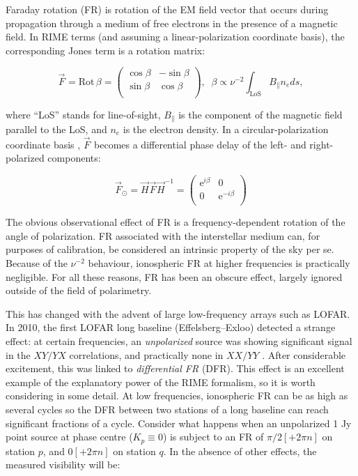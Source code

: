 \documentclass{aa}
\newcommand{\matrixtt}[4]{\left( \begin{array}{cc}#1&#2\\#3&#4\\\end{array} \right)}
\newcommand{\jones}[2]{\vec {#1}_{#2}}
\newcommand{\jonesinv}[2]{\vec {#1}^{-1}_{#2}}
\begin{document}
Faraday rotation (FR) is rotation of the EM field vector that occurs during propagation through a medium of free electrons in the presence of a magnetic field. In RIME terms (and assuming a linear-polarization coordinate basis), the corresponding Jones term is a rotation matrix:

\begin{equation}\label{eq:FR}
\jones{F}{} = \mathrm{Rot}\,\beta = \matrixtt{\cos\beta}{-\sin\beta}{\sin\beta}{\cos\beta}, \;\;
\beta \propto \nu^{-2} \int_\mathrm{LoS} B_{\parallel} n_e ds,
\end{equation}

where ``LoS'' stands for line-of-sight, $B_{\parallel}$ is the component of the magnetic field parallel to the LoS, and $n_e$ is the electron density. In a circular-polarization coordinate basis \citep[see Paper I,][Sect.~6.3]{RRIME1}, $\jones{F}{}$ becomes a differential phase delay of the left- and right-polarized components:

\[
\jones{F}{\odot} = \jones{H}{}\jones{F}{}\jonesinv{H}{} = \matrixtt{\mathrm{e}^{i\beta}}{0}{0}{\mathrm{e}^{-i\beta}}
\]

The obvious observational effect of FR is a frequency-dependent rotation of the angle of polarization. FR associated with the interstellar medium can, for purposes of calibration, be considered an intrinsic property of the sky per se. Because of the $\nu^{-2}$ behaviour, ionospheric FR at higher frequencies is practically negligible. For all these reasons, FR has been an obscure effect, largely ignored outside of the field of polarimetry.

This has changed with the advent of large low-frequency arrays such as LOFAR. In 2010, the first LOFAR long baseline (Effelsberg--Exloo) detected a strange effect: at certain frequencies, an \emph{unpolarized} source was showing significant signal in the $XY/YX$ correlations, and practically none in $XX/YY$ \citep{Wucknitz:DFR}. After considerable excitement, this was linked to \emph{differential FR} (DFR). This effect is an excellent example of the explanatory power of the RIME formalism, so it is worth considering in some detail. At low frequencies, ionospheric FR can be as high as several cycles \citep[e.g. 15 cycles at 100 MHz, see][Sect.~10.3]{tms} so the DFR between two stations of a long baseline can reach significant fractions of a cycle. Consider what happens when an unpolarized 1 Jy point source at phase centre ($K_p\equiv0$) is subject to an FR of $\pi/2[+2\pi n]$ on station $p$, and $0[+2\pi n]$ on station $q$. In the absence of other effects, the measured visibility will be:
\end{document}
